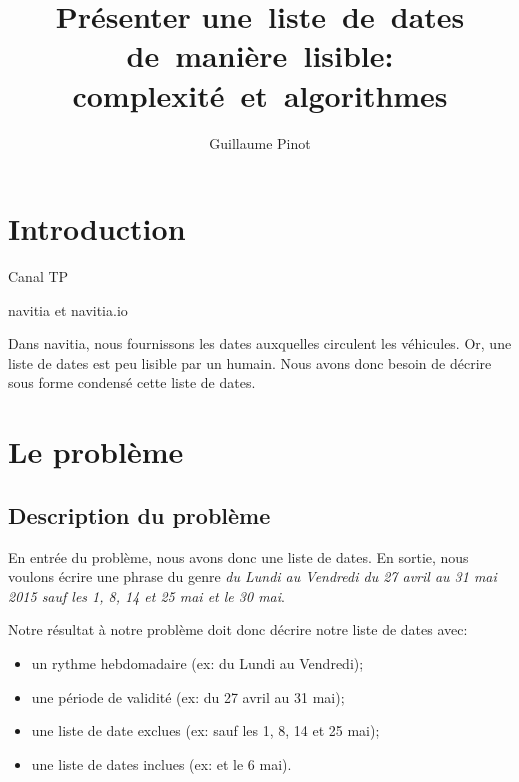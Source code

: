 \documentclass{roadef}
\begin{document}
\title{Présenter une~liste~de~dates de~manière~lisible: complexité~et~algorithmes}

\def\shorttitle{Présenter une~liste~de~dates de~manière~lisible}

\author{Guillaume Pinot}

{}

\maketitle
\thispagestyle{empty}



\section{Introduction}

Canal TP

navitia et navitia.io

Dans navitia, nous fournissons les dates auxquelles circulent les
véhicules.  Or, une liste de dates est peu lisible par un humain. Nous
avons donc besoin de décrire sous forme condensé cette liste de dates.

\section{Le problème}

\subsection{Description du problème}

En entrée du problème, nous avons donc une liste de dates.  En sortie,
nous voulons écrire une phrase du genre \emph{du Lundi au Vendredi du
  27 avril au 31 mai 2015 sauf les 1, 8, 14 et 25 mai et le 30 mai}.

Notre résultat à notre problème doit donc décrire notre liste de dates
avec:
\begin{itemize}
\item un rythme hebdomadaire (ex: du Lundi au Vendredi);
\item une période de validité (ex: du 27 avril au 31 mai);
\item une liste de date exclues (ex: sauf les 1, 8, 14 et 25 mai);
\item une liste de dates inclues (ex: et le 6 mai).
\end{itemize}
\end{document}
